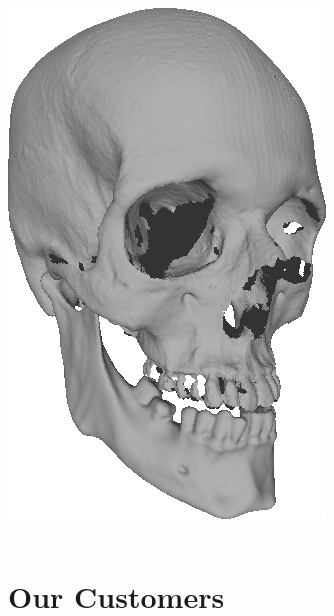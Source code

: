 \begin{frame}
\begin{columns}
    \begin{column}{0.2\textwidth}
      \includegraphics[width=.9\textwidth]{images/skull2}\\
    \end{column}
  \end{columns}
\end{frame}

\section{Our Customers}

